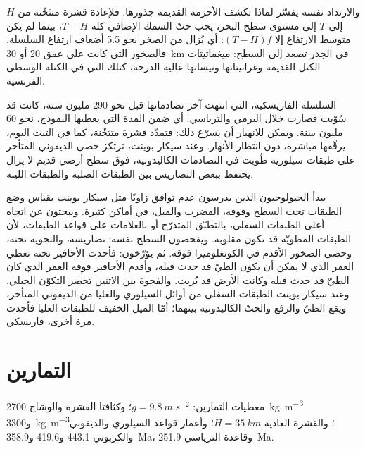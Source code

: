 والارتداد نفسه يفسّر لماذا تكشف الأحزمة القديمة جذورها. فلإعادة قشرة متثخّنة من
$H$ إلى $T$ إلى مستوى سطح البحر، يجب حتّ السمك الإضافي كله $T - H$، بينما لم يكن متوسط
الارتفاع إلا $(T - H)f$: أي يُزال من الصخر نحو 5.5 أضعاف ارتفاع
السلسلة. فالصخور التي كانت على عمق 20 أو \qty{30}{km} في الجذر تصعد إلى السطح:
ميغماتيتات الكتل القديمة وغرانيتاتها ونيساتها عالية الدرجة، كتلك التي في الكتلة
الوسطى الفرنسية.

السلسلة الفاريسكية، التي انتهت آخر تصادماتها قبل نحو 290 مليون سنة، كانت قد
سُوّيت فصارت  خلال البرمي والترياسي: أي ضمن المدة التي يعطيها النموذج،
نحو 60 مليون سنة. ويمكن للانهيار أن يسرّع ذلك: فتمدّد قشرة متثخّنة، كما في
التبت اليوم، يرقّقها مباشرة، دون انتظار الأنهار. وعند سيكار بوينت، ترتكز حصى الديفوني المتأخر على
طبقات سيلورية طُويت في التصادمات الكاليدونية، فوق سطح أرضي قديم لا يزال يحتفظ
ببعض التضاريس بين الطبقات الصلبة والطبقات اللينة.

\begin{inthefield}
يبدأ الجيولوجيون الذين يدرسون عدم توافق زاويًا مثل سيكار بوينت بقياس
وضع الطبقات تحت السطح وفوقه، المضرب والميل، في أماكن كثيرة. ويبحثون
عن اتجاه أعلى الطبقات السفلى، بالتطبّق المتدرّج أو بالعلامات على قواعد الطبقات،
لأن الطبقات المطويّة قد تكون مقلوبة. ويفحصون السطح نفسه: تضاريسه،
والتجوية تحته، وحصى الصخور الأقدم في الكونغلوميرا فوقه. ثم يؤرّخون:
فأحدث الأحافير تحته تعطي العمر الذي لا يمكن أن يكون الطيّ قد حدث قبله،
وأقدم الأحافير فوقه العمر الذي كان الطيّ قد حدث قبله وكانت الأرض قد بُريت.
والفجوة بين الاثنين تحصر التكوّن الجبلي. وعند سيكار بوينت الطبقات السفلى من أوائل
السيلوري والعليا من الديفوني المتأخر، ويقع الطيّ والرفع والحتّ الكاليدونية
بينهما؛ أمّا الميل الخفيف للطبقات العليا فأحدث مرة أخرى، فاريسكي.
\end{inthefield}

\section*{التمارين}\label{sec:b2:wilson-cycle:exercises}

معطيات التمارين: $g = \qty{9.8}{m.s^{-2}}$؛ وكثافتا القشرة والوشاح
\qty{2700}{kg.m^{-3}} و\qty{3300}{kg.m^{-3}}؛ والقشرة العادية $H = \qty{35}{km}$؛ وأعمار
قواعد السيلوري والديفوني والكربوني 443.1 و419.6 و\qty{358.9}{Ma}، وقاعدة
الترياسي \qty{251.9}{Ma}.

